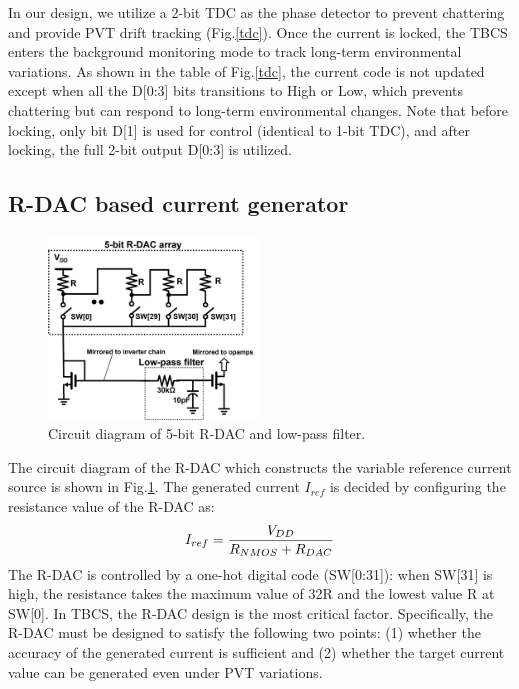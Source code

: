 \documentclass[paper]{ieice}
\begin{document}
In our design, we utilize a 2-bit TDC as the phase detector to prevent chattering and  provide PVT drift tracking (Fig.\ref{tdc}).
Once the current is locked, the TBCS enters the background monitoring mode to track long-term environmental variations.  As shown in the table of Fig.\ref{tdc}, the current code is not updated except when all the D[0:3] bits transitions to High or Low, which prevents chattering but can respond to long-term environmental changes. Note that before locking, only bit D[1] is used for control (identical to 1-bit TDC), and after locking, the full 2-bit output D[0:3] is utilized.

\subsection{R-DAC based current generator}
\begin{figure}[!]
\centering
 \includegraphics[width=0.5\textwidth]{figs/rdac.png}
  \caption{Circuit diagram of 5-bit R-DAC and low-pass filter.}
\label{rdac_sche}
\end{figure}

The circuit diagram of the R-DAC which constructs the variable reference current source is shown in Fig.\ref{rdac_sche}. The generated current $I_{ref}$ is decided by configuring the resistance value of the R-DAC as:
\begin{eqnarray}
    \centering
     I_{ref} = \frac{V_{DD}}{R_{NMOS}+R_{DAC}}
    \label{iref_eq}
\end{eqnarray}
The R-DAC is controlled by a one-hot digital code (SW[0:31]): when SW[31] is high, the resistance takes the maximum value of 32R and the lowest value R at SW[0]. In TBCS, the R-DAC design is the most critical factor. Specifically, the R-DAC must be designed to satisfy the following two points: (1) whether the accuracy of the generated current is sufficient and (2) whether the target current value can be generated even under PVT variations.
\end{document}
